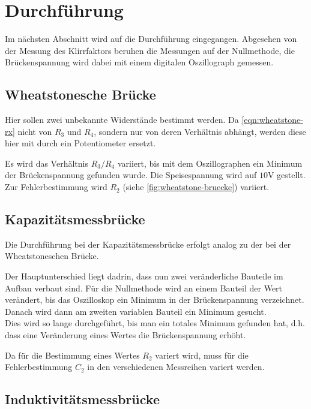 \section{Durchführung}
\label{sec:Durchführung}
Im nächsten Abschnitt wird auf die Durchführung eingegangen. Abgesehen von der Messung des
Klirrfaktors beruhen die Messungen auf der 
Nullmethode, die Brückenspannung wird dabei mit einem digitalen Oszillograph gemessen.

\subsection{Wheatstonesche Brücke}
\label{sec:exec-wheatstone}

Hier sollen zwei unbekannte Widerstände bestimmt werden. Da \autoref{eqn:wheatstone-rx} nicht von 
$R_3$ und $R_4$, sondern nur von deren Verhältnis abhängt,
werden diese hier mit durch ein Potentiometer ersetzt.

Es wird das Verhältnis $R_3/R_4$ variiert, bis mit dem Oszillographen ein Minimum der Brückenspannung
gefunden wurde. Die Speisespannung wird auf $10\si{\volt}$ gestellt. Zur Fehlerbestimmung wird $R_2$
(siehe \autoref{fig:wheatstone-bruecke}) variiert.

\subsection{Kapazitätsmessbrücke}
\label{sec:exec-kapazitaetsmessbrueck}

Die Durchführung bei der Kapazitätsmessbrücke erfolgt analog zu der bei der Wheatstoneschen Brücke.

Der Hauptunterschied liegt dadrin, dass nun zwei veränderliche Bauteile im Aufbau verbaut sind. Für die
Nullmethode wird an einem Bauteil der Wert verändert, bis das Oszilloskop ein Minimum in der Brückenspannung
verzeichnet. Danach wird dann am zweiten variablen Bauteil ein Minimum gesucht.
\\
Dies wird so lange durchgeführt, bis man ein totales Minimum gefunden hat, d.h. dass eine Veränderung eines
Wertes die Brückenspannung erhöht.

Da für die Bestimmung eines Wertes $R_2$ variert wird, muss für die Fehlerbestimmung $C_2$ in den 
verschiedenen Messreihen variert werden.

\subsection{Induktivitätsmessbrücke}
\label{sec:exec-induktivitätsmessbrücke}

